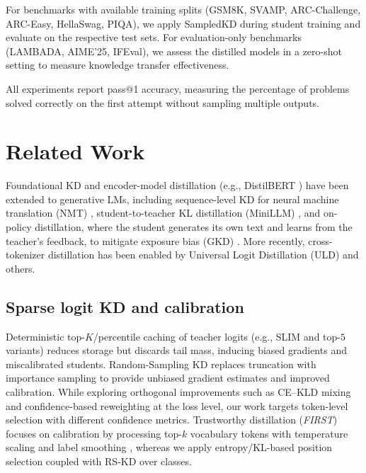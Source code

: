 \documentclass[11pt]{article}
\begin{document}
For benchmarks with available training splits (GSM8K, SVAMP, ARC-Challenge, ARC-Easy, HellaSwag, PIQA), we apply SampledKD during student training and evaluate on the respective test sets. For evaluation-only benchmarks (LAMBADA, AIME'25, IFEval), we assess the distilled models in a zero-shot setting to measure knowledge transfer effectiveness.

All experiments report pass@1 accuracy, measuring the percentage of problems solved correctly on the first attempt without sampling multiple outputs.

\section{Related Work}

Foundational KD \citep{hinton2015distillation} and encoder-model distillation (e.g., DistilBERT \citep{sanh2019distilbert}) have been extended to generative LMs, including sequence-level KD for neural machine translation (NMT) \citep{kim2016sequencekd}, student-to-teacher KL distillation (MiniLLM) \citep{gu2023minillm}, and on-policy distillation, where the student generates its own text and learns from the teacher's feedback, to mitigate exposure bias (GKD) \citep{agarwal2024gkd}.
More recently, cross-tokenizer distillation has been enabled by Universal Logit Distillation (ULD) \citep{boizard2024uld} and others.

\subsection{Sparse logit KD and calibration}
Deterministic top-$K$/percentile caching of teacher logits (e.g., SLIM \citep{raman2023slim} and top-$5$ variants) reduces storage but discards tail mass, inducing biased gradients and miscalibrated students.
Random-Sampling KD \citep{anshumann2025sparse} replaces truncation with importance sampling to provide unbiased gradient estimates and improved calibration.
While exploring orthogonal improvements such as CE--KLD mixing and confidence-based reweighting at the loss level, our work targets token-level selection with different confidence metrics.
Trustworthy distillation (\emph{FIRST}) focuses on calibration by processing top-$k$ vocabulary tokens with temperature scaling and label smoothing \citep{shum2024first}, whereas we apply entropy/KL-based position selection coupled with RS-KD over classes.
\end{document}

